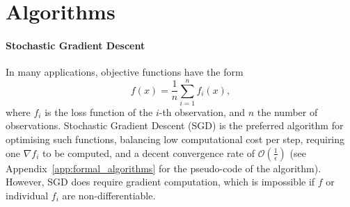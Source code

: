 \section{Algorithms}

\paragraph{Stochastic Gradient Descent}
In many applications, objective functions have the form 
\begin{equation}\label{GeneralProb}
    f(x) = \frac{1}{n}\sum_{i=1}^n f_i(x),
\end{equation}
where $f_i$ is the loss function of the $i$-th observation, and $n$ the number of observations. Stochastic Gradient Descent (SGD) is the preferred algorithm for optimising such functions, balancing low computational cost per step, requiring one $\nabla f_i$ to be computed, and a decent convergence rate of $\mathcal{O}\left(\frac{1}{\epsilon}\right)$ \cite{bottou2018optimization} (see Appendix~\ref{app:formal_algorithms} for the pseudo-code of the algorithm). However, SGD does require gradient computation, which is impossible if $f$ or individual $f_i$ are non-differentiable.


